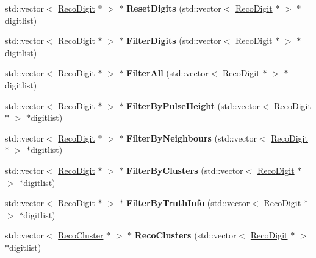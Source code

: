 \begin{DoxyCompactItemize}
\item 
\hypertarget{classHitCleaner_a3c85370ccb39e1615976fe4acb218fb5}{std\-::vector$<$ \hyperlink{classRecoDigit}{Reco\-Digit} $\ast$ $>$ $\ast$ {\bfseries Reset\-Digits} (std\-::vector$<$ \hyperlink{classRecoDigit}{Reco\-Digit} $\ast$ $>$ $\ast$digitlist)}\label{classHitCleaner_a3c85370ccb39e1615976fe4acb218fb5}

\item 
\hypertarget{classHitCleaner_a16028ae7a55a4cdcfdb116af893d2542}{std\-::vector$<$ \hyperlink{classRecoDigit}{Reco\-Digit} $\ast$ $>$ $\ast$ {\bfseries Filter\-Digits} (std\-::vector$<$ \hyperlink{classRecoDigit}{Reco\-Digit} $\ast$ $>$ $\ast$digitlist)}\label{classHitCleaner_a16028ae7a55a4cdcfdb116af893d2542}

\item 
\hypertarget{classHitCleaner_a7e6188a785adddfcaa3dbe63de387e95}{std\-::vector$<$ \hyperlink{classRecoDigit}{Reco\-Digit} $\ast$ $>$ $\ast$ {\bfseries Filter\-All} (std\-::vector$<$ \hyperlink{classRecoDigit}{Reco\-Digit} $\ast$ $>$ $\ast$digitlist)}\label{classHitCleaner_a7e6188a785adddfcaa3dbe63de387e95}

\item 
\hypertarget{classHitCleaner_a537c7f9b371c0dc52df86046f8a90336}{std\-::vector$<$ \hyperlink{classRecoDigit}{Reco\-Digit} $\ast$ $>$ $\ast$ {\bfseries Filter\-By\-Pulse\-Height} (std\-::vector$<$ \hyperlink{classRecoDigit}{Reco\-Digit} $\ast$ $>$ $\ast$digitlist)}\label{classHitCleaner_a537c7f9b371c0dc52df86046f8a90336}

\item 
\hypertarget{classHitCleaner_ad574e2c8d1718971cbfce2a284731daa}{std\-::vector$<$ \hyperlink{classRecoDigit}{Reco\-Digit} $\ast$ $>$ $\ast$ {\bfseries Filter\-By\-Neighbours} (std\-::vector$<$ \hyperlink{classRecoDigit}{Reco\-Digit} $\ast$ $>$ $\ast$digitlist)}\label{classHitCleaner_ad574e2c8d1718971cbfce2a284731daa}

\item 
\hypertarget{classHitCleaner_a32e29edc8c7564e423186efacbea07c5}{std\-::vector$<$ \hyperlink{classRecoDigit}{Reco\-Digit} $\ast$ $>$ $\ast$ {\bfseries Filter\-By\-Clusters} (std\-::vector$<$ \hyperlink{classRecoDigit}{Reco\-Digit} $\ast$ $>$ $\ast$digitlist)}\label{classHitCleaner_a32e29edc8c7564e423186efacbea07c5}

\item 
\hypertarget{classHitCleaner_ad2c117045b0a63c700b0f2a94f3fa0b2}{std\-::vector$<$ \hyperlink{classRecoDigit}{Reco\-Digit} $\ast$ $>$ $\ast$ {\bfseries Filter\-By\-Truth\-Info} (std\-::vector$<$ \hyperlink{classRecoDigit}{Reco\-Digit} $\ast$ $>$ $\ast$digitlist)}\label{classHitCleaner_ad2c117045b0a63c700b0f2a94f3fa0b2}

\item 
\hypertarget{classHitCleaner_a0e516802fcbaad1e3e61978911991949}{std\-::vector$<$ \hyperlink{classRecoCluster}{Reco\-Cluster} $\ast$ $>$ $\ast$ {\bfseries Reco\-Clusters} (std\-::vector$<$ \hyperlink{classRecoDigit}{Reco\-Digit} $\ast$ $>$ $\ast$digitlist)}\label{classHitCleaner_a0e516802fcbaad1e3e61978911991949}

\end{DoxyCompactItemize}
